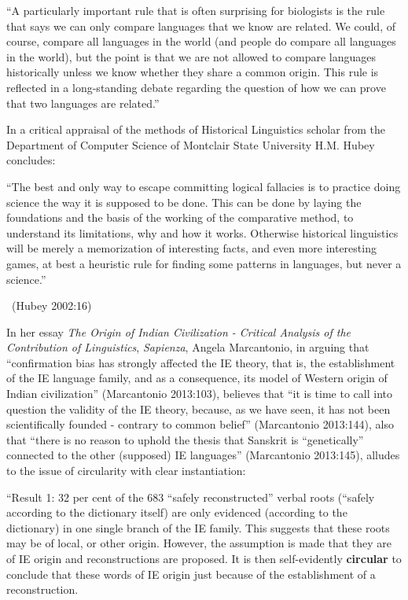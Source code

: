 \begin{myquote}
“A particularly important rule that is often surprising for biologists is the rule that says we can only compare languages that we know are related. We could, of course, compare all languages in the world (and people do compare all languages in the world), but the point is that we are not allowed to compare languages historically unless we know whether they share a common origin. This rule is reflected in a long-standing debate regarding the question of how we can prove that two languages are related.”
\end{myquote}

In a critical appraisal of the methods of Historical Linguistics scholar from the Department of Computer Science of Montclair State University H.M. Hubey concludes:

\begin{myquote}
“The best and only way to escape committing logical fallacies is to practice doing science the way it is supposed to be done. This can be done by laying the foundations and the basis of the working of the comparative method, to understand its limitations, why and how it works. Otherwise historical linguistics will be merely a memorization of interesting facts, and even more interesting games, at best a heuristic rule for finding some patterns in languages, but never a science.” 

~\hfill (Hubey 2002:16)
\end{myquote}

In her essay \textit{The Origin of Indian Civilization - Critical Analysis of the Contribution of Linguistics}, \textit{Sapienza}, Angela Marcantonio, in arguing that “confirmation bias has strongly affected the IE theory, that is, the establishment of the IE language family, and as a consequence, its model of Western origin of Indian civilization” (Marcantonio 2013:103), believes that “it is time to call into question the validity of the IE theory, because, as we have seen, it has not been scientifically founded - contrary to common belief” (Marcantonio 2013:144), also that “there is no reason to uphold the thesis that Sanskrit is “genetically” connected to the other (supposed) IE languages” (Marcantonio 2013:145), alludes to the issue of circularity with clear instantiation:

\begin{myquote}
“Result 1: 32 per cent of the 683 “safely reconstructed” verbal roots (“safely according to the dictionary itself) are only evidenced (according to the dictionary) in one single branch of the IE family. This suggests that these roots may be of local, or other origin. However, the assumption is made that they are of IE origin and reconstructions are proposed. It is then self-evidently \textbf{circular} to conclude that these words of IE origin just because of the establishment of a reconstruction. 
\end{myquote}

